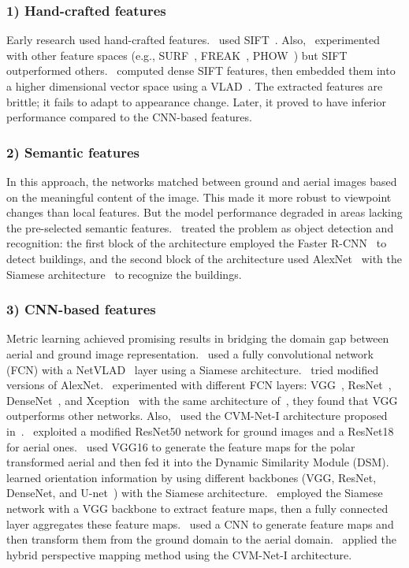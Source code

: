 \documentclass[10pt,letterpaper]{article}
\begin{document}
\subsubsection*{1) Hand-crafted features}
Early research used hand-crafted features.~\cite{bib20,bib26} used SIFT~\cite{bib27}. Also,~\cite{bib20} experimented with other feature spaces (e.g., SURF~\cite{bib28}, FREAK~\cite{bib29}, PHOW~\cite{bib30}) but SIFT outperformed others.~\cite{bib7} computed dense SIFT features, then embedded them into a higher dimensional vector space using a VLAD~\cite{bib31}. The extracted features are brittle; it fails to adapt to appearance change. Later, it proved to have inferior performance compared to the CNN-based features.
\subsubsection*{2) Semantic features}
In this approach, the networks matched between ground and aerial images based on the meaningful content of the image. This made it more robust to viewpoint changes than local features. But the model performance degraded in areas lacking the pre-selected semantic features.~\cite{bib32} treated the problem as object detection and recognition: the first block of the architecture employed the Faster R-CNN~\cite{bib33} to detect buildings, and the second block of the architecture used AlexNet~\cite{bib34} with the Siamese architecture~\cite{bib35} to recognize the buildings.
\subsubsection*{3) CNN-based features}
Metric learning achieved promising results in bridging the domain gap between aerial and ground image representation.~\cite{bib36} used a fully convolutional network (FCN) with a NetVLAD~\cite{bib34} layer using a Siamese architecture.~\cite{bib37} tried modified versions of AlexNet.~\cite{bib21} experimented with different FCN layers: VGG~\cite{bib31}, ResNet~\cite{bib38}, DenseNet~\cite{bib39}, and Xception~\cite{bib40} with the same architecture of~\cite{bib36}, they found that VGG outperforms other networks. Also,~\cite{bib22} used the CVM-Net-I architecture proposed in~\cite{bib36}.~\cite{bib41} exploited a modified ResNet50 network for ground images and a ResNet18 for aerial ones.~\cite{bib13} used VGG16 to generate the feature maps for the polar transformed aerial and then fed it into the Dynamic Similarity Module (DSM).~\cite{bib4} learned orientation information by using different backbones (VGG, ResNet, DenseNet, and U-net~\cite{bib42}) with the Siamese architecture.~\cite{bib43} employed  the Siamese network with a VGG backbone to extract feature maps, then a fully connected layer aggregates these feature maps.~\cite{bib44} used a CNN to generate feature maps and then transform them from the ground domain to the aerial domain.~\cite{bib14} applied the hybrid perspective mapping method using the CVM-Net-I architecture.
\end{document}
